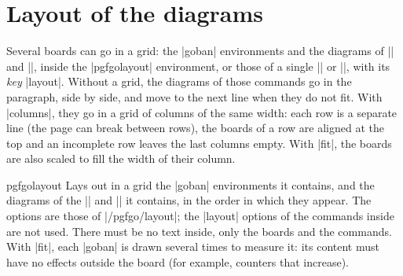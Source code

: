 \section{Layout of the diagrams}
\label{subsec:disposicion}

Several boards can go in a grid: the |goban| environments and the diagrams of |\sgfdiagrams| and |\sgfproblem|, inside the |pgfgolayout| environment, or those of a single |\sgfdiagrams| or |\sgfproblem|, with its \emph{key} |layout|. Without a grid, the diagrams of those commands go in the paragraph, side by side, and move to the next line when they do not fit. With |columns|, they go in a grid of columns of the same width: each row is a separate line (the page can break between rows), the boards of a row are aligned at the top and an incomplete row leaves the last columns empty. With |fit|, the boards are also scaled to fill the width of their column.

\begin{environment}{{pgfgolayout}}
	Lays out in a grid the |goban| environments it contains, and the diagrams of the |\sgfdiagrams| and |\sgfproblem| it contains, in the order in which they appear. The options are those of |/pgfgo/layout|; the |layout| options of the commands inside are not used. There must be no text inside, only the boards and the commands. With |fit|, each |goban| is drawn several times to measure it: its content must have no effects outside the board (for example, counters that increase).

	\begin{codeexample}
		\begin{pgfgolayout}[columns = 4, fit]
			\begin{goban}[5]\end{goban}
			\begin{goban}[5]\end{goban}
		\end{pgfgolayout}
	\end{codeexample}
\end{environment}

\begin{pgfgolayout}[columns = 4, fit]
	\begin{goban}[5]\end{goban}
	\begin{goban}[5]\end{goban}
\end{pgfgolayout}

